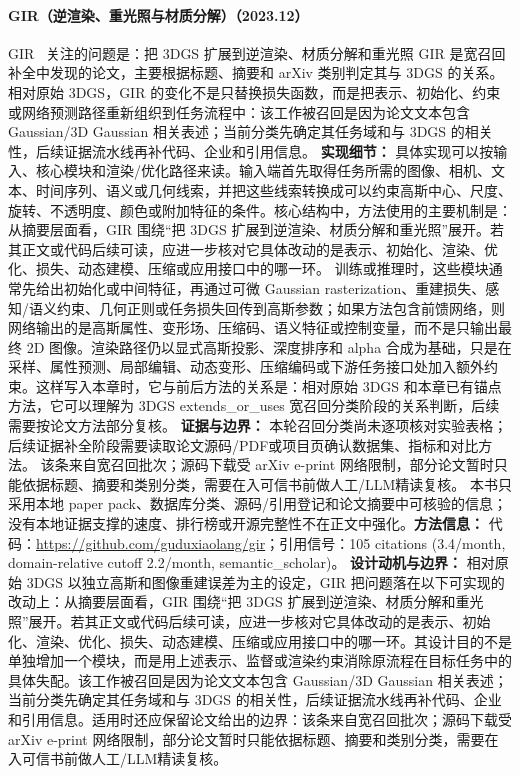 \paragraph{GIR（逆渲染、重光照与材质分解）（2023.12）}
GIR~\cite{2312_05133} 关注的问题是：把 3DGS 扩展到逆渲染、材质分解和重光照 GIR 是宽召回补全中发现的论文，主要根据标题、摘要和 arXiv 类别判定其与 3DGS 的关系。
相对原始 3DGS，GIR 的变化不是只替换损失函数，而是把表示、初始化、约束或网络预测路径重新组织到任务流程中：该工作被召回是因为论文文本包含 Gaussian/3D Gaussian 相关表述；当前分类先确定其任务域和与 3DGS 的相关性，后续证据流水线再补代码、企业和引用信息。
\textbf{实现细节：} 具体实现可以按输入、核心模块和渲染/优化路径来读。输入端首先取得任务所需的图像、相机、文本、时间序列、语义或几何线索，并把这些线索转换成可以约束高斯中心、尺度、旋转、不透明度、颜色或附加特征的条件。核心结构中，方法使用的主要机制是：从摘要层面看，GIR 围绕“把 3DGS 扩展到逆渲染、材质分解和重光照”展开。若其正文或代码后续可读，应进一步核对它具体改动的是表示、初始化、渲染、优化、损失、动态建模、压缩或应用接口中的哪一环。 训练或推理时，这些模块通常先给出初始化或中间特征，再通过可微 Gaussian rasterization、重建损失、感知/语义约束、几何正则或任务损失回传到高斯参数；如果方法包含前馈网络，则网络输出的是高斯属性、变形场、压缩码、语义特征或控制变量，而不是只输出最终 2D 图像。渲染路径仍以显式高斯投影、深度排序和 alpha 合成为基础，只是在采样、属性预测、局部编辑、动态变形、压缩编码或下游任务接口处加入额外约束。这样写入本章时，它与前后方法的关系是：相对原始 3DGS 和本章已有锚点方法，它可以理解为 3DGS extends\_or\_uses 宽召回分类阶段的关系判断，后续需要按论文方法部分复核。
\textbf{证据与边界：} 本轮召回分类尚未逐项核对实验表格；后续证据补全阶段需要读取论文源码/PDF或项目页确认数据集、指标和对比方法。 该条来自宽召回批次；源码下载受 arXiv e-print 网络限制，部分论文暂时只能依据标题、摘要和类别分类，需要在入可信书前做人工/LLM精读复核。 本书只采用本地 paper pack、数据库分类、源码/引用登记和论文摘要中可核验的信息；没有本地证据支撑的速度、排行榜或开源完整性不在正文中强化。\textbf{方法信息：} 代码：\url{https://github.com/guduxiaolang/gir}；引用信号：105 citations (3.4/month, domain-relative cutoff 2.2/month, semantic\_scholar)。
\textbf{设计动机与边界：} 相对原始 3DGS 以独立高斯和图像重建误差为主的设定，GIR 把问题落在以下可实现的改动上：从摘要层面看，GIR 围绕“把 3DGS 扩展到逆渲染、材质分解和重光照”展开。若其正文或代码后续可读，应进一步核对它具体改动的是表示、初始化、渲染、优化、损失、动态建模、压缩或应用接口中的哪一环。其设计目的不是单独增加一个模块，而是用上述表示、监督或渲染约束消除原流程在目标任务中的具体失配。该工作被召回是因为论文文本包含 Gaussian/3D Gaussian 相关表述；当前分类先确定其任务域和与 3DGS 的相关性，后续证据流水线再补代码、企业和引用信息。适用时还应保留论文给出的边界：该条来自宽召回批次；源码下载受 arXiv e-print 网络限制，部分论文暂时只能依据标题、摘要和类别分类，需要在入可信书前做人工/LLM精读复核。
